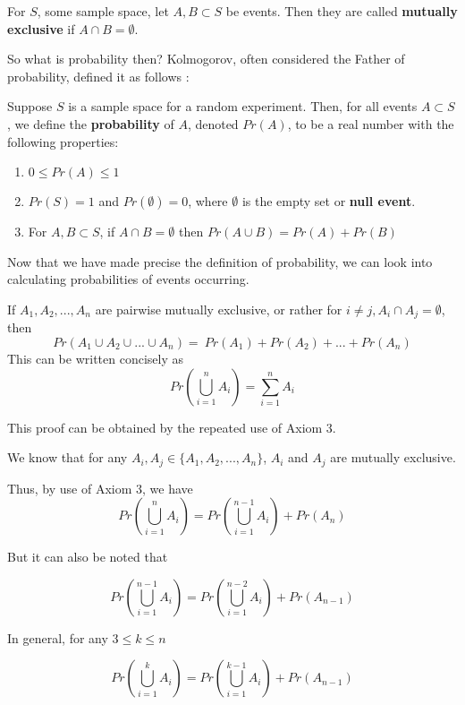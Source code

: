 \begin{defn}
For $S$, some sample space, let $A, B \subset S$ be events. Then they are called \textbf{mutually exclusive}
if $A \cap B = \emptyset$.
\end{defn}

So what is probability then? Kolmogorov, often considered the Father of
probability, defined it as follows \cite{IntroStat}:

\begin{defn}
Suppose $S$ is a sample space for a random experiment. Then, for all events
$A \subset S$, we define the \textbf{probability} of $A$, denoted $Pr(A)$, to be a real
number with the following properties:
\begin{enumerate}
\item $0 \leq Pr(A) \leq 1$
\item $Pr(S) = 1$ and $Pr(\emptyset) = 0$, where $\emptyset$ is the empty set or \textbf{null event}.
\item For $A, B \subset S$, if $A \cap B = \emptyset$ then $Pr(A \cup B) = Pr(A) + Pr(B)$
\end{enumerate}
\end{defn}

Now that we have made precise the definition of probability, we can look
into calculating probabilities of events occurring. 

\begin{thm}
If $A_1, A_2, ... ,A_n$ are pairwise mutually
exclusive, or rather for $i \neq j, A_i \cap A_j = \emptyset$, then
\begin{equation}
    Pr(A_1 \cup A_2 \cup ... \cup A_n) = \
    Pr(A_1) + Pr(A_2) + ... + Pr(A_n)
\end{equation}
This can be written concisely as
\begin{equation}
    Pr\left(\bigcup _{i=1}^nA_i\right) = \sum _{i=1}^nA_i 
\end{equation}
\end{thm}

\begin{prf}
This proof can be obtained by the repeated use of Axiom 3.

We know that for any $A_i, A_j \in \{A_1, A_2, ... , A_n\}$,
$A_i$ and $A_j$ are mutually exclusive.

Thus, by use of Axiom 3, we have 
\begin{equation}
Pr\left(\bigcup _{i=1} ^n A_i\right) = Pr\left(\bigcup _{i=1} ^{n-1} A_i\right) + Pr(A_n)
\end{equation}

But it can also be noted that 

\begin{equation}
Pr\left(\bigcup _{i=1} ^{n-1} A_i\right) = Pr\left(\bigcup _{i=1} ^{n-2} A_i\right) + Pr(A_{n-1})
\end{equation}

In general, for any $3 \leq k \leq n$

\begin{equation}
Pr\left(\bigcup _{i=1} ^{k} A_i\right) = Pr\left(\bigcup _{i=1} ^{k-1} A_i\right) + Pr(A_{n-1})
\end{equation}
\end{prf}

